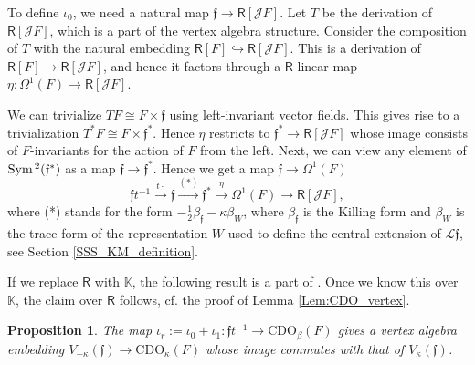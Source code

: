 \documentclass{amsart}
\newtheorem{Prop}[Thm]{Proposition}
\theoremstyle{definition}
\newcommand{\Sym}{\on{Sym}\hspace{.5mm}}
\newcommand{\on}{\mathrm}
\newcommand{\Ring}{\mathsf{R}}
\newcommand{\Jet}{\mathscr{J}}
\newcommand{\Loop}{\mathscr{L}}
\newcommand{\K}{\mathbb{K}}
\newcommand{\ff}{\mathfrak{f}}
\newcommand{\CDO}{\mathrm{CDO}}
\numberwithin{equation}{section}
\begin{document}
To define $\iota_0$, we need a natural map $\mathfrak{f} \to \Ring[\Jet F]$. Let $T$ be the  derivation of $\Ring[\Jet F]$, which is a part of the vertex algebra structure. Consider the composition of $T$ with the natural embedding $\Ring[F]\hookrightarrow \Ring[\Jet F]$. This is a derivation of $\Ring[F]\rightarrow \Ring[\Jet F]$, and hence it factors through a $\Ring$-linear map $\eta: \Omega^1(F) \rightarrow \Ring[\Jet F]$. 

We can trivialize $TF \cong F\times \mathfrak{f}$ using left-invariant vector fields. This gives rise to a trivialization $T^*F\cong F\times \mathfrak{f}^*$. Hence $\eta$ restricts to $\mathfrak{f}^* \to \Ring[\Jet F]$ whose image consists of $F$-invariants for the action of $F$ from the left. Next, we can view any element of $\Sym^2(\ff^*)$ as a map $\mathfrak{f}\rightarrow \mathfrak{f}^*$. Hence we get a map $\mathfrak{f}\rightarrow \Omega^1(F)$
$$\mathfrak{f}t^{-1}\xrightarrow{t\cdot}\mathfrak{f}
\xrightarrow{(*)} \mathfrak{f}^*\xrightarrow{\eta}\Omega^1(F)\rightarrow \Ring[\Jet F],$$
where (*) stands for the form $-\frac{1}{2}\beta_{\ff}-\kappa\beta_W$, where $\beta_{\ff}$ is the Killing form and $\beta_W$ is the trace form of the representation $W$ used to define the central extension of $\Loop \ff$, see Section \ref{SSS_KM_definition}.

If we replace $\Ring$ with $\K$, the following result is a part of \cite[Theorem 3.7]{Arkhipov_Gaitsgory}.
Once we know this over $\K$, the claim over $\Ring$ follows, cf. the proof of Lemma \ref{Lem:CDO_vertex}.

\begin{Prop}\label{Prop:commuting_embedding}
The map $\iota_r:=\iota_0+\iota_1:  \mathfrak{f}t^{-1}\rightarrow  \CDO_\beta(F)$ gives a vertex algebra embedding $V_{-\kappa}(\mathfrak{f}) \to \CDO_\kappa(F)$ whose image commutes with that of $V_\kappa(\mathfrak{f})$.
\end{Prop}
\end{document}
